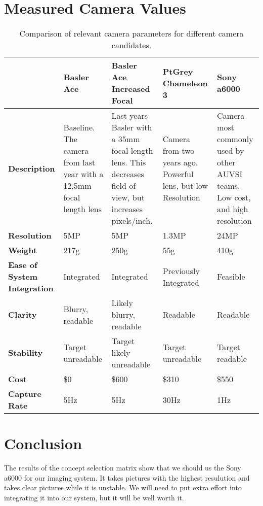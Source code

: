 \documentclass[]{auvsi_doc}
\begin{document}
\section{Measured Camera Values}
\begin{table}[H]
	\centering
	\caption{Comparison of relevant camera parameters for different camera candidates.}
	\begin{tabular}{|p{2.5cm}|p{2.9cm}|p{2.9cm}|p{2.9cm}|p{2.9cm}|}
	\hline
	\rowcolor[HTML]{C0C0C0}
& {\color[HTML]{000000} \textbf{Basler Ace}} & {\color[HTML]{000000} \textbf{Basler Ace Increased Focal}} & {\color[HTML]{000000} \textbf{PtGrey Chameleon 3}} & {\color[HTML]{000000} \textbf{Sony a6000}}\\ \hline
{\color[HTML]{000000} \textbf{Description}}	&	Baseline. The camera from last year with a 12.5mm focal length lens	&	Last years Basler with a 35mm focal length lens. This decreases field of view, but increases pixels/inch. &	Camera from two years ago. Powerful lens, but low Resolution	&	Camera most commonly used by other AUVSI teams. Low cost, and high resolution\\ \hline
{\color[HTML]{000000} \textbf{Resolution}}	&	5MP	&	5MP	&	1.3MP	&	24MP\\ \hline
{\color[HTML]{000000} \textbf{Weight}}	&	217g	&	250g	&	55g	&	410g\\ \hline
{\color[HTML]{000000} \textbf{Ease of System Integration}}	&	Integrated	&	Integrated	&	Previously Integrated	&	Feasible\\ \hline
{\color[HTML]{000000} \textbf{Clarity}}	&	Blurry, readable	&	Likely blurry, readable	&	Readable 	& Readable\\ \hline
{\color[HTML]{000000} \textbf{Stability}}	& Target unreadable	&	Target likely unreadable	&	Target unreadable	&	Target readable\\ \hline
{\color[HTML]{000000} \textbf{Cost}}	&	\$0 	&	\$600 	&	\$310	&	\$550\\ \hline
{\color[HTML]{000000} \textbf{Capture Rate}}	&	5Hz	&	5Hz	&	30Hz	&	1Hz\\ \hline
	\end{tabular}
\end{table}

\section{Conclusion}

The results of the concept selection matrix show that we should us the Sony a6000 for our imaging system.
It takes pictures with the highest resulution and takes clear pictures while it is unstable. We will need to put extra effort into integrating it into our system, but it will be well worth it.
\end{document}
